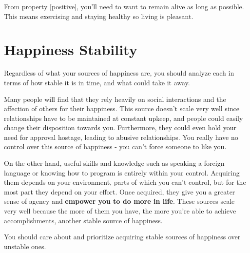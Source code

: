 \documentclass{report}
\begin{document}
From property \ref{positive}, you'll need to want to remain alive as long as
possible. This means exercising and staying healthy so living is pleasant. 

\section{Happiness Stability}
Regardless of what your sources of happiness are, you should analyze
each in terms of how stable it is in time, and what could take it away.

Many people will find that they rely heavily on social interactions and the
affection of others for their happiness. This source doesn't scale very well 
since relationships have to be maintained at constant upkeep, 
and people could easily change their disposition towards you.
Furthermore, they could even hold your need for approval hostage, leading to
abusive relationships. You really have no control over this source of happiness
- you can't force someone to like you.


On the other hand, useful skills and knowledge such as speaking a 
foreign language or knowing how to program is entirely within your control.
Acquiring them depends on your environment, parts of which you can't control,
but for the most part they depend on your effort. Once acquired, they give
you a greater sense of agency and \textbf{empower you to do more in life}.
These sources scale very well because the more of them you have, the more
you're able to achieve accomplishments, another stable source of happiness.

You should care about and prioritize acquiring stable sources of happiness over
unstable ones.
\end{document}
